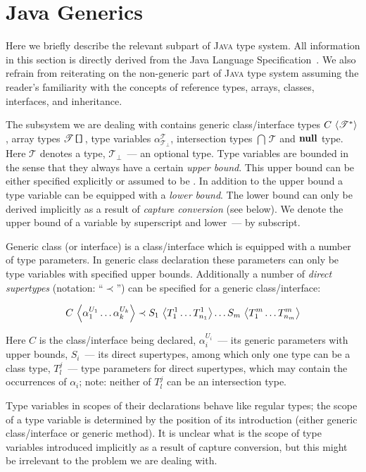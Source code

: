 \section{Java Generics}

Here we briefly describe the relevant subpart of \textsc{Java} type system. All
information in this section is directly derived from the Java Language Specification~\cite{JLS}.
We also refrain from reiterating on the non-generic part of \textsc{Java} type system assuming the reader's familiarity
with the concepts of reference types, arrays, classes, interfaces, and inheritance.

The subsystem we are dealing with contains generic class/interface types ${C}\,\left<{\mathscr{T}^*}\right>$, array types $\mathscr{T}\mbox{\texttt{[]}}$,
type variables $\alpha^\mathscr{T}_\mathscr{T_\bot}$, intersection types $\bigcap\,\mathscr{T}$ and  $\mathbf{null}$ type.
Here $\mathscr{T}$ denotes a type, $\mathscr{T}_\bot$~--- an optional type.
Type variables are bounded in the sense that they always have a certain \emph{upper bound}. This upper
bound can be either specified explicitly or assumed to be . In addition
to the upper bound a type variable can be equipped with a \emph{lower bound}. The lower bound can only
be derived implicitly as a result of \emph{capture conversion} (see below). We denote the upper bound of a variable
by  superscript and lower~--- by subscript.

Generic class (or interface) is a class/interface which is equipped with a number of
type parameters. In generic class declaration these parameters can only be type
variables with specified upper bounds. Additionally a number of \emph{direct supertypes} (notation: ``$\prec$'')
can be specified for a generic class/interface:

\[
{C}\,\left<{\alpha_1^{U_1}\dots \alpha_k^{U_k}}\right>\prec{S_1}\,\left<{T^1_1\dots T^1_{n_1}}\right>\dots{S_m}\,\left<{T^m_1\dots T^m_{n_m}}\right>
\]

Here $C$ is the class/interface being declared, $\alpha_i^{U_i}$~--- its generic parameters with upper
bounds, $S_i$~--- its direct supertypes, among which only one type can be a class type, $T^j_l$~--- type
parameters for direct supertypes, which may contain the occurrences of $\alpha_i$; note: neither of $T^j_l$ can be
an intersection type.

Type variables in scopes of their declarations behave like regular types; the scope of a type variable is
determined by the position of its introduction (either generic class/interface or generic method). It
is unclear what is the scope of type variables introduced implicitly as a result of capture
conversion, but this might be irrelevant to the problem we are dealing with.

